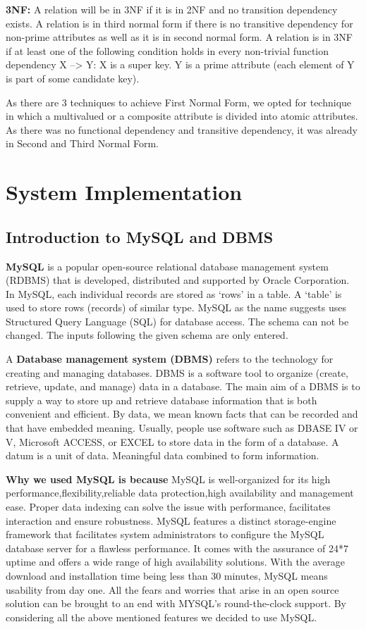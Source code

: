 \documentclass{report}
\begin{document}
\textbf{3NF:}
A relation will be in 3NF if it is in 2NF and no transition dependency exists.
    A relation is in third normal form if there is no transitive dependency for non-prime attributes as well as it is in second normal form.
A relation is in 3NF if at least one of the following condition holds in every non-trivial function dependency X –> Y:
X is a super key.
Y is a prime attribute (each element of Y is part of some candidate key).

As there are 3 techniques to achieve First Normal Form, we opted for technique in which a multivalued or a composite attribute is divided into atomic attributes.
As there was no functional dependency and transitive dependency, it was already in Second and Third Normal Form.
\chapter{System Implementation}
\section{Introduction to MySQL and DBMS}
\hspace{0.5cm} \textbf{MySQL} is a popular open-source relational database management system (RDBMS) that is developed,
distributed and supported by Oracle Corporation.
In MySQL, each individual records are stored as ‘rows’ in a table.
A ‘table’ is used to store rows (records) of similar type.
MySQL as the name suggests uses Structured Query Language (SQL) for database access. 
The schema can not be changed. The inputs following the given schema are only entered.

A \textbf{Database management system (DBMS)} refers to the technology for creating and managing databases. 
DBMS is a software tool to organize (create, retrieve, update, and manage) data in a database.
The main aim of a DBMS is to supply a way to store up and retrieve database information that is both 
convenient and efficient. By data, we mean known facts that can be recorded and that have embedded meaning. Usually, people use software such as DBASE IV or V, Microsoft ACCESS, or EXCEL to store data in the form of a database. A datum is a unit of data. Meaningful data combined to form information.

\textbf{Why we used MySQL is because} MySQL is well-organized for its high performance,flexibility,reliable data protection,high availability and management ease. Proper data indexing can solve the issue with performance, facilitates interaction and ensure robustness. MySQL features a distinct storage-engine framework that facilitates system administrators to configure the MySQL database server for a flawless performance. It comes with the assurance of 24*7 uptime and offers a wide range of high availability solutions. With the average download and installation time being less than 30 minutes, MySQL means usability from day one. All the fears and worries that arise in an open source solution can be brought to an end with MYSQL’s round-the-clock support. By considering all the above mentioned features we decided to use MySQL.
\end{document}
